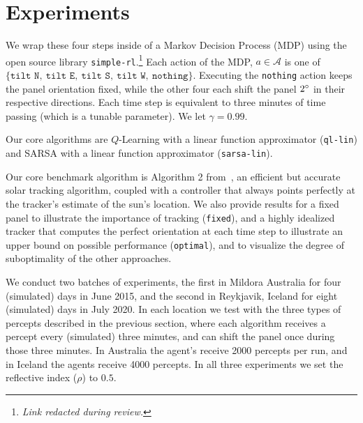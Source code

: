 \documentclass{article}
\newcommand{\mc}{\mathcal}
\begin{document}
{%
\section{Experiments}


We wrap these four steps inside of a Markov Decision Process (MDP) using the open source library \texttt{simple-rl}.\footnote{{\it Link redacted during review.}} Each action of the MDP, $a \in \mc{A}$ is one of $\{\texttt{tilt N},\ \texttt{tilt E},\ \texttt{tilt S},\ \texttt{tilt W},\ \texttt{nothing}\}$. Executing the \texttt{nothing} action keeps the panel orientation fixed, while the other four each shift the panel $2\degree$ in their respective directions. Each time step is equivalent to three minutes of time passing (which is a tunable parameter). We let $\gamma=0.99$.

Our core algorithms are $Q$-Learning with a linear function approximator (\texttt{ql-lin}) and SARSA with a linear function approximator (\texttt{sarsa-lin}). 

Our core benchmark algorithm is Algorithm 2 from~\citet{Grena2012}, an efficient but accurate solar tracking algorithm, coupled with a controller that always points perfectly at the tracker's estimate of the sun's location. We also provide results for a fixed panel to illustrate the importance of tracking (\texttt{fixed}), and a highly idealized tracker that computes the perfect orientation at each time step to illustrate an upper bound on possible performance (\texttt{optimal}), and to visualize the degree of suboptimality of the other approaches.


We conduct two batches of experiments, the first in Mildora Australia for four (simulated) days in June 2015, and the second in Reykjavik, Iceland for eight (simulated) days in July 2020. In each location we test with the three types of percepts described in the previous section, where each algorithm receives a percept every (simulated) three minutes, and can shift the panel once during those three minutes. In Australia the agent's receive 2000 percepts per run, and in Iceland the agents receive 4000 percepts. In all three experiments we set the reflective index ($\rho$) to $0.5$.


}
\end{document}
